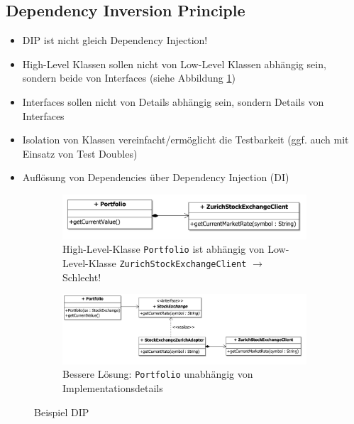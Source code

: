 \subsection{Dependency Inversion Principle}

\begin{itemize}
	\item DIP ist nicht gleich Dependency Injection!
	\item High-Level Klassen sollen nicht von Low-Level Klassen abhängig sein, sondern beide von Interfaces (siehe Abbildung \ref{fig:dip-beispiel})
	\item Interfaces sollen nicht von Details abhängig sein, sondern Details von Interfaces
	\item Isolation von Klassen vereinfacht/ermöglicht die Testbarkeit (ggf. auch mit Einsatz von Test Doubles)
	\item Auflösung von Dependencies über Dependency Injection (DI)
\end{itemize}

\begin{figure}[h!]
	\centering
	\begin{subfigure}[b]{0.8\textwidth}
		\includegraphics[width=\textwidth]{fig/dip-schlecht}
		\caption{High-Level-Klasse \texttt{Portfolio} ist abhängig von Low-Level-Klasse \texttt{ZurichStockExchangeClient} $\rightarrow$ Schlecht!}
	\end{subfigure}
	\begin{subfigure}[b]{\textwidth}
		\includegraphics[width=\textwidth]{fig/dip-besser}
		\caption{Bessere Lösung: \texttt{Portfolio} unabhängig von Implementationsdetails}
	\end{subfigure}
	\caption{Beispiel DIP}\label{fig:dip-beispiel}
\end{figure}
